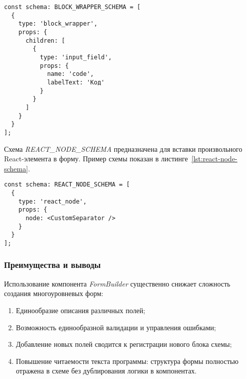 \begin{lstlisting}[caption={Пример схемы \textit{BLOCK\_WRAPPER\_SCHEMA}},label={lst:block-wrapper-schema}]
const schema: BLOCK_WRAPPER_SCHEMA = [
  {
    type: 'block_wrapper',
    props: {
      children: [
        {
          type: 'input_field',
          props: {
            name: 'code',
            labelText: 'Код'
          }
        }
      ]
    }
  }
];
\end{lstlisting}

Схема \textit{REACT\_NODE\_SCHEMA} предназначена для вставки произвольного React-элемента в форму. Пример схемы показан в листинге~\ref{lst:react-node-schema}.

\begin{lstlisting}[caption={Пример схемы \textit{REACT\_NODE\_SCHEMA}},label={lst:react-node-schema}]
const schema: REACT_NODE_SCHEMA = [
  {
    type: 'react_node',
    props: {
      node: <CustomSeparator />
    }
  }
];
\end{lstlisting}

\subsubsection{Преимущества и выводы}
Использование компонента \textit{FormBuilder} существенно снижает сложность создания многоуровневых форм:
\begin{enumerate}
  \item Единообразие описания различных полей;
  \item Возможность единообразной валидации и управления ошибками;
  \item Добавление новых полей сводится к регистрации нового блока схемы;
  \item Повышение читаемости текста программы: структура формы полностью отражена в схеме без дублирования логики в компонентах.
\end{enumerate}


